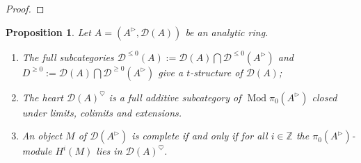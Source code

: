 \documentclass{article}
\theoremstyle{plain}
\newtheorem{prop}[thm]{Proposition}
\theoremstyle{definition}
\theoremstyle{remark}
\DeclareMathOperator{\modcat}{Mod}
\newcommand{\huflag}{\triangleright}
\newcommand{\D}{\mathcal{D}}
\newcommand{\heart}{\heartsuit}
\begin{document}
\begin{proof}

\end{proof}

\begin{prop}
Let $ A = (A ^{\huflag}, \D (A)) $ be an analytic ring.
\begin{enumerate}
\item The full subcategories $ \D ^{\leq 0}(A) := \D (A) \bigcap \D ^{\leq 0}(A ^{\huflag}) $ and $ D ^{\geq 0} := \D (A) \bigcap \D ^{\geq 0} (A ^{\huflag}) $
give a $ t $-structure of $ \D (A) $;
\item The heart $ \D (A)^{\heart} $ is a full additive subcategory of $ \modcat{\pi _{0}(A ^{\huflag})} $ closed under limits, colimits
and extensions.
\item An object $ M $ of $ \D (A ^{\huflag}) $ is complete if and only if for all $ i\in \mathbb{Z} $ the $ \pi _{0}(A ^{\huflag}) $-module
$ H ^{i}(M) $ lies in $ \D (A)^{\heart} $.
\end{enumerate}
\end{prop}
\end{document}
